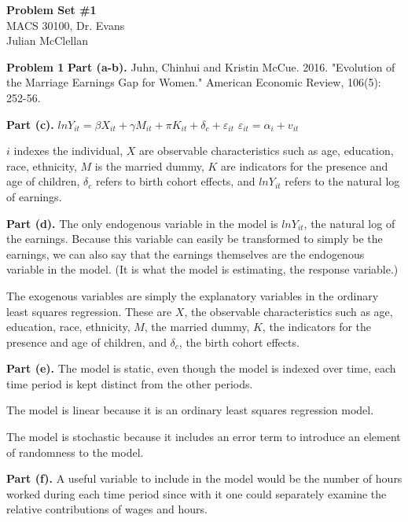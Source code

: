 \documentclass[letterpaper,12pt]{article}
\theoremstyle{definition}
\begin{document}
\begin{flushleft}
  \textbf{\large{Problem Set \#1}} \\
  MACS 30100, Dr. Evans \\
  Julian McClellan
\end{flushleft}

\vspace{5mm}

\noindent\textbf{Problem 1} 
\newline
\noindent\textbf{Part (a-b).} 
Juhn, Chinhui and Kristin McCue. 2016. "Evolution of the Marriage Earnings Gap for Women." American Economic Review, 106(5): 252-56.

\noindent\textbf{Part (c).} 
$ln Y_{it}=\beta X_{it}+\gamma M_{it}+\pi K_{it}+\delta _{c}+\varepsilon _{it}$
$\varepsilon _{it} = \alpha _{i}+v_{it}$

$i$ indexes the individual, $X$ are observable characteristics such as age, education, race, ethnicity, $M$ is the married dummy, $K$ are indicators for the presence and age of children, $\delta _{c}$ refers to birth cohort effects, and $ln Y_{it}$ refers to the natural log of earnings.

\noindent\textbf{Part (d).}
The only endogenous variable in the model is $ln Y_{it}$, the natural log of the earnings. Because this variable can easily be transformed to simply be the earnings, we can also say that the earnings themselves are the endogenous variable in the model. (It is what the model is estimating, the response variable.)

The exogenous variables are simply the explanatory variables in the ordinary least squares regression. These are $X$, the observable characteristics such as age, education, race, ethnicity, $M$, the married dummy, $K$, the indicators for the presence and age of children, and $\delta _{c}$, the birth cohort effects.

\noindent\textbf{Part (e).}
The model is static, even though the model is indexed over time, each time period is kept distinct from the other periods.

The model is linear because it is an ordinary least squares regression model.

The model is stochastic because it includes an error term to introduce an element of randomness to the model.

\noindent\textbf{Part (f).}
A useful variable to include in the model would be the number of hours worked during each time period since with it one could separately examine the relative contributions of wages and hours.
\end{document}
